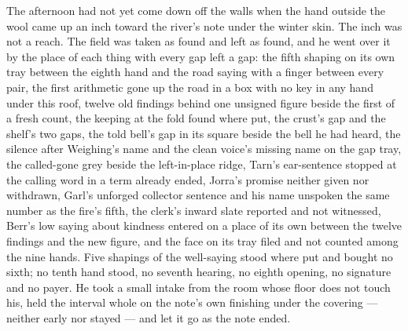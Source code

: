 The afternoon had not yet come down off the walls when the hand outside the wool came up an inch toward the river's note under the winter skin. The inch was not a reach. The field was taken as found and left as found, and he went over it by the place of each thing with every gap left a gap: the fifth shaping on its own tray between the eighth hand and the road saying with a finger between every pair, the first arithmetic gone up the road in a box with no key in any hand under this roof, twelve old findings behind one unsigned figure beside the first of a fresh count, the keeping at the fold found where put, the crust's gap and the shelf's two gaps, the told bell's gap in its square beside the bell he had heard, the silence after Weighing's name and the clean voice's missing name on the gap tray, the called-gone grey beside the left-in-place ridge, Tarn's ear-sentence stopped at the calling word in a term already ended, Jorra's promise neither given nor withdrawn, Garl's unforged collector sentence and his name unspoken the same number as the fire's fifth, the clerk's inward slate reported and not witnessed, Berr's low saying about kindness entered on a place of its own between the twelve findings and the new figure, and the face on its tray filed and not counted among the nine hands. Five shapings of the well-saying stood where put and bought no sixth; no tenth hand stood, no seventh hearing, no eighth opening, no signature and no payer. He took a small intake from the room whose floor does not touch his, held the interval whole on the note's own finishing under the covering --- neither early nor stayed --- and let it go as the note ended.

